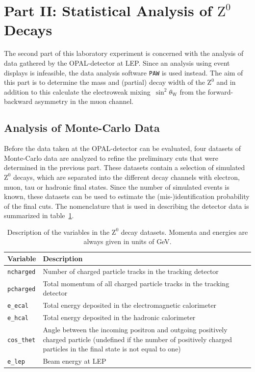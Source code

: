 \documentclass[11pt, a4paper]{article}
\numberwithin{equation}{section}
\begin{document}
\clearpage
\section{Part II: Statistical Analysis of $\mathrm{Z}^0$ Decays}
The second part of this laboratory experiment is concerned with the analysis of data gathered by the OPAL-detector at LEP.
Since an analysis using event displays is infeasible, the data analysis software \texttt{PAW} is used instead.
The aim of this part is to determine the mass and (partial) decay width of the $\mathrm{Z}^0$ and in addition to this calculate the electroweak mixing~$\sin^2\theta_\mathrm{W}$ from the forward-backward asymmetry in the muon channel.

\subsection{Analysis of Monte-Carlo Data}
\label{sec:analysis_mc_data}
Before the data taken at the OPAL-detector can be evaluated, four datasets of Monte-Carlo data are analyzed to refine the preliminary cuts that were determined in the previous part.
These datasets contain a selection of simulated $\mathrm{Z}^0$ decays, which are separated into the different decay channels with electron, muon, tau or hadronic final states.
Since the number of simulated events is known, these datasets can be used to estimate the (mis-)identification probability of the final cuts.
The nomenclature that is used in describing the detector data is summarized in table~\ref{tab:desc_variables}.

\begin{table}[H]
	\centering
	\begin{tabularx}{0.9\textwidth}{lX}
		\toprule
		\textbf{Variable} & \textbf{Description} \\
		\midrule		
		\texttt{ncharged} & Number of charged particle tracks in the tracking detector \\
		\texttt{pcharged} & Total momentum of all charged particle tracks in the tracking detector \\
		\texttt{e\_ecal} & Total energy deposited in the electromagnetic calorimeter \\
		\texttt{e\_hcal} & Total energy deposited in the hadronic calorimeter \\
		\texttt{cos\_thet} & Angle between the incoming positron and outgoing positively charged particle (undefined if the number of positively charged particles in the final state is not equal to one) \\
		\texttt{e\_lep} & Beam energy at LEP \\
		\bottomrule
	\end{tabularx}
	\caption{Description of the variables in the $\mathrm{Z}^0$ decay datasets. Momenta and energies are always given in units of GeV.}
	\label{tab:desc_variables}
\end{table}
\end{document}

